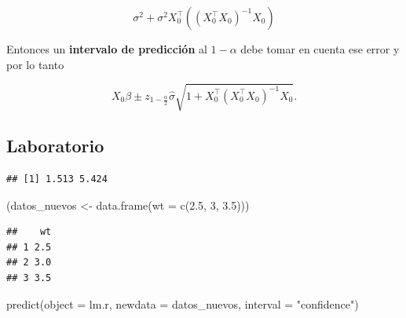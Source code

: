 \documentclass[
  12pt,
]{book}
\newenvironment{Shaded}{\begin{snugshade}}{\end{snugshade}}
\newcommand{\AttributeTok}[1]{\textcolor[rgb]{0.77,0.63,0.00}{#1}}
\newcommand{\DecValTok}[1]{\textcolor[rgb]{0.00,0.00,0.81}{#1}}
\newcommand{\FloatTok}[1]{\textcolor[rgb]{0.00,0.00,0.81}{#1}}
\newcommand{\FunctionTok}[1]{\textcolor[rgb]{0.00,0.00,0.00}{#1}}
\newcommand{\NormalTok}[1]{#1}
\newcommand{\OtherTok}[1]{\textcolor[rgb]{0.56,0.35,0.01}{#1}}
\newcommand{\SpecialCharTok}[1]{\textcolor[rgb]{0.00,0.00,0.00}{#1}}
\newcommand{\StringTok}[1]{\textcolor[rgb]{0.31,0.60,0.02}{#1}}
\theoremstyle{definition}
\theoremstyle{definition}
\theoremstyle{definition}
\theoremstyle{definition}
\theoremstyle{remark}
\begin{document}
\begin{equation*}
\sigma^{2} +  \sigma^{2}X_{0}^{\top}((X_{0}^{\top}X_{0})^{-1}X_{0}) 
\end{equation*}

Entonces un \textbf{intervalo de predicción} al \(1-\alpha\) debe tomar en cuenta ese error y por lo tanto

\begin{equation*}
X_{0}\beta \pm z_{1-\frac{\alpha}{2}} \hat{\sigma} \sqrt{1+X_{0}^{\top}(X_{0}^{\top}X_{0})^{-1}X_{0}}.
\end{equation*}

\hypertarget{laboratorio-4}{%
\subsection{Laboratorio}\label{laboratorio-4}}

\begin{Shaded}
\end{Shaded}

\begin{verbatim}
## [1] 1.513 5.424
\end{verbatim}

\begin{Shaded}
\begin{Highlighting}[]
\NormalTok{(datos\_nuevos }\OtherTok{\textless{}{-}} \FunctionTok{data.frame}\NormalTok{(}\AttributeTok{wt =} \FunctionTok{c}\NormalTok{(}\FloatTok{2.5}\NormalTok{, }\DecValTok{3}\NormalTok{, }\FloatTok{3.5}\NormalTok{)))}
\end{Highlighting}
\end{Shaded}

\begin{verbatim}
##    wt
## 1 2.5
## 2 3.0
## 3 3.5
\end{verbatim}

\begin{Shaded}
\begin{Highlighting}[]
\FunctionTok{predict}\NormalTok{(}\AttributeTok{object =}\NormalTok{ lm.r, }\AttributeTok{newdata =}\NormalTok{ datos\_nuevos, }\AttributeTok{interval =} \StringTok{"confidence"}\NormalTok{)}
\end{Highlighting}
\end{Shaded}
\end{document}

